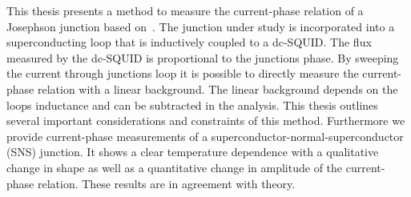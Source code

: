 This thesis presents a method to measure the current-phase relation of a Josephson junction based on~\cite{frolovMeasurementCurrentPhaseRelation2004}. The junction under study is incorporated into a superconducting loop that is inductively coupled to a dc-SQUID. The flux measured by the dc-SQUID is proportional to the junctions phase. By sweeping the current through junctions loop it is possible to directly measure the current-phase relation with a linear background. The linear background depends on the loops inductance and can be subtracted in the analysis. This thesis outlines several important considerations and constraints of this method. Furthermore we provide current-phase measurements of a superconductor-normal-superconductor (SNS) junction. It shows a clear temperature dependence with a qualitative change in shape as well as a quantitative change in amplitude of the current-phase relation. These results are in agreement with theory.